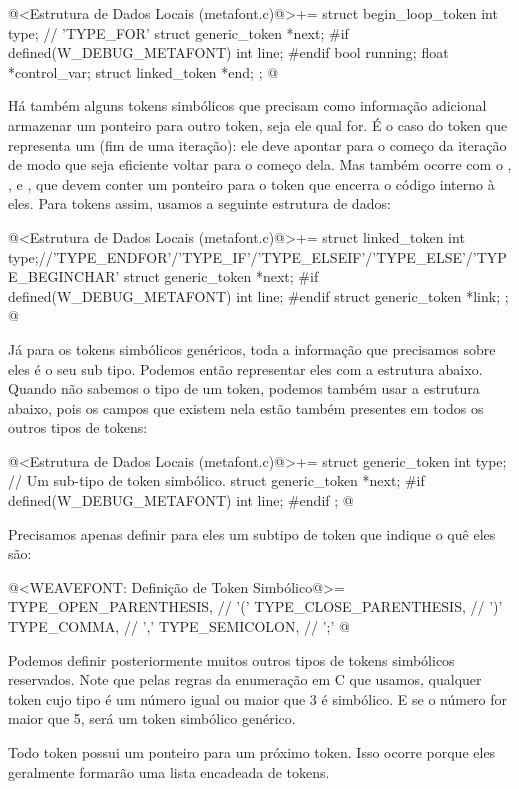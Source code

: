 \iniciocodigo
@<Estrutura de Dados Locais (metafont.c)@>+=
struct begin_loop_token{
  int type;   // 'TYPE_FOR'
  struct generic_token *next;
#if defined(W_DEBUG_METAFONT)
  int line;
#endif
  bool running;
  float *control_var;
  struct linked_token *end;
};
@
\fimcodigo

Há também alguns tokens simbólicos que precisam como informação
adicional armazenar um ponteiro para outro token, seja ele qual for. É
o caso do token que representa um  (fim de uma
iteração): ele deve apontar para o começo da iteração de modo que seja
eficiente voltar para o começo dela. Mas também ocorre com
o , ,  e
, que devem conter um ponteiro para o token
que encerra o código interno à eles. Para tokens assim, usamos a
seguinte estrutura de dados:

\iniciocodigo
@<Estrutura de Dados Locais (metafont.c)@>+=
struct linked_token{
  int type;//'TYPE_ENDFOR'/'TYPE_IF'/'TYPE_ELSEIF'/'TYPE_ELSE'/'TYPE_BEGINCHAR'
  struct generic_token *next;
#if defined(W_DEBUG_METAFONT)
  int line;
#endif
  struct generic_token *link;
};
@
\fimcodigo


Já para os tokens simbólicos genéricos, toda a informação que
precisamos sobre eles é o seu sub tipo. Podemos então representar eles
com a estrutura abaixo. Quando não sabemos o tipo de um token, podemos
também usar a estrutura abaixo, pois os campos que existem nela estão
também presentes em todos os outros tipos de tokens:

\iniciocodigo
@<Estrutura de Dados Locais (metafont.c)@>+=
struct generic_token{
  int type;   // Um sub-tipo de token simbólico.
  struct generic_token *next;
#if defined(W_DEBUG_METAFONT)
  int line;
#endif
};
@
\fimcodigo

Precisamos apenas definir para eles um subtipo de token que indique o quê
eles são:

\iniciocodigo
@<WEAVEFONT: Definição de Token Simbólico@>=
TYPE_OPEN_PARENTHESIS,  // '('
TYPE_CLOSE_PARENTHESIS, // ')'
TYPE_COMMA,             // ','
TYPE_SEMICOLON,         // ';'
@
\fimcodigo

Podemos definir posteriormente muitos outros tipos de tokens
simbólicos reservados. Note que pelas regras da enumeração em C que
usamos, qualquer token cujo tipo é um número igual ou maior que 3 é
simbólico. E se o número for maior que 5, será um token simbólico
genérico.

Todo token possui um ponteiro para um próximo token. Isso ocorre
porque eles geralmente formarão uma lista encadeada de tokens.

